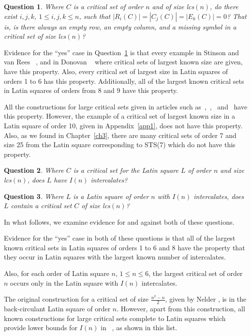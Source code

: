 \documentclass[12pt]{report}
\newtheorem{question}{Question}
\def\lcs#1{{\rm lcs}$(#1)$}
\begin{document}
%
\begin{question}\label{q431}
Where $C$ is a critical set of order $n$ and of size \lcs{n},
do there exist $i,j,k$, $1 \leq i,j,k \leq n$, such that
$|R_{i}(C)| = |C_{j}(C)| = |E_{k}(C)| = 0$?  That is, is there
always an empty row, an empty column, and a missing symbol in a critical
set of size \lcs{n}?
\end{question}
Evidence for the ``yes'' case in Question~\ref{q431} is that every
example in Stinson and van Rees ~\cite{MR84g:05036}, and in Donovan
~\cite{MR99k:05038} where critical sets of largest known size are given,
have this property.  Also, every critical set of largest size in Latin
squares of orders 1 to 6 has this property.  Additionally, all of the
largest known critical sets in Latin squares of orders from 8 and 9 have
this property.

All the constructions for large critical sets given in articles
such as~\cite{MR99a:05018},~\cite{MR96h:05030},~\cite{nel2} and~\cite{MR84g:05036}
have this property.  However, the example of a critical set of largest known size in a Latin square
of order 10, given in Appendix~\ref{app1}, does not have this property.  Also, as
we found in Chapter~\ref{ch3}, there are many critical sets of order 7 and size 25
from the Latin square corresponding to STS(7) which do not have this property.

\begin{question}\label{q432}
Where $C$ is a critical set for the Latin square $L$ of order $n$ and size
\lcs{n}, does $L$ have $I(n)$ intercalates?
\end{question}

\begin{question}\label{q433}
Where $L$ is a Latin square of order $n$ with $I(n)$ intercalates,
does $L$ contain a critical set $C$ of size \lcs{n}?
\end{question}
%

In what follows, we examine evidence for and against both of these 
questions.

Evidence for the ``yes'' case in both of these questions is that all of
the largest known critical sets in Latin squares of orders 1 to 6 and 8 have
the property that they occur in Latin squares with the largest known
number of intercalates.

Also, for each order of Latin square $n$, $1 \leq n \leq 6$, the largest
critical set of order $n$ occurs only in the Latin square with $I(n)$
intercalates.

The original construction for a critical set of size $\displaystyle{\frac{n^2-n}{2}}$,
given by Nelder \cite{nel2}, is in the back-circulant Latin square of
order $n$.  However, apart from this construction, all known constructions
for large critical sets complete to Latin squares which provide lower bounds
for $I(n)$ in ~\cite{MR84g:05034}, as shown in this list.
\end{document}
